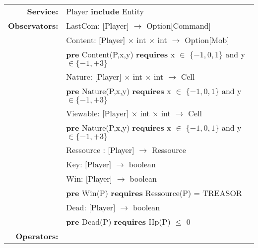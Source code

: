 \documentclass[11pt]{article}
\begin{document}
\begin{tabular}{rl}

\textbf{Service:}& \quad Player \textbf{include} Entity\\
\textbf{Observators:} &
\quad LastCom: [Player] $\rightarrow$ Option[Command]\\
& \quad Content: [Player] $\times$ int $\times$ int $\rightarrow$ Option[Mob]\\
& 
\textbf{pre} Content(P,x,y) \textbf{requires} x $\in$ $\{-1,0,1\}$ and y $\in \{-1,+3\}$\\
& \quad Nature: [Player] $\times$ int $\times$ int $\rightarrow$ Cell\\
& \textbf{pre} Nature(P,x,y) \textbf{requires} x $\in$ $\{-1,0,1\}$ and y $\in \{-1,+3\}$\\
& \quad Viewable: [Player] $\times$ int $\times$ int $\rightarrow$ Cell\\

& \textbf{pre} Nature(P,x,y) \textbf{requires} x $\in$ $\{-1,0,1\}$ and y $\in \{-1,+3\}$\\
& \quad Ressource : [Player] $\rightarrow$ Ressource\\
& \quad Key: [Player] $\rightarrow$ boolean\\
& \quad Win: [Player] $\rightarrow$ boolean\\
& \textbf{pre} Win(P) \textbf{requires}  Ressource(P) = TREASOR\\
& \quad Dead: [Player] $\rightarrow$ boolean\\
& \textbf{pre} Dead(P) \textbf{requires} Hp(P) $\leq$ 0\\

\textbf{Operators:}
\end{tabular}
\end{document}
